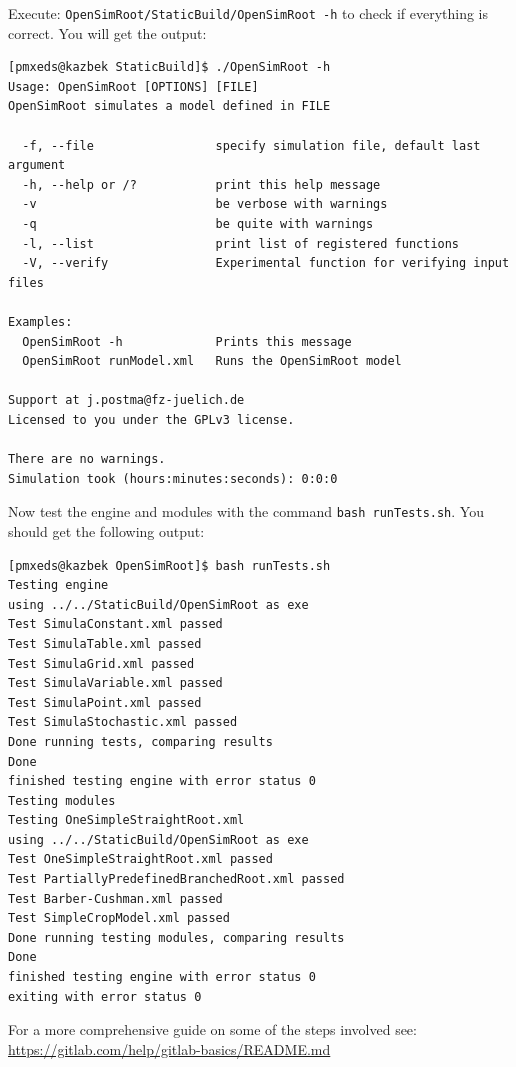 \documentclass{article}
\begin{document}
\noindent Execute: \verb|OpenSimRoot/StaticBuild/OpenSimRoot -h| to check if everything is correct. You will get the output:

\begin{verbatim}
[pmxeds@kazbek StaticBuild]$ ./OpenSimRoot -h
Usage: OpenSimRoot [OPTIONS] [FILE]
OpenSimRoot simulates a model defined in FILE

  -f, --file                 specify simulation file, default last argument
  -h, --help or /?           print this help message
  -v                         be verbose with warnings
  -q                         be quite with warnings
  -l, --list                 print list of registered functions
  -V, --verify               Experimental function for verifying input files

Examples:
  OpenSimRoot -h             Prints this message
  OpenSimRoot runModel.xml   Runs the OpenSimRoot model 

Support at j.postma@fz-juelich.de
Licensed to you under the GPLv3 license.

There are no warnings.
Simulation took (hours:minutes:seconds): 0:0:0
\end{verbatim}

\noindent Now test the engine and modules with the command \verb|bash runTests.sh|. You should get the following output:

\begin{verbatim}
[pmxeds@kazbek OpenSimRoot]$ bash runTests.sh 
Testing engine
using ../../StaticBuild/OpenSimRoot as exe
Test SimulaConstant.xml passed
Test SimulaTable.xml passed
Test SimulaGrid.xml passed
Test SimulaVariable.xml passed
Test SimulaPoint.xml passed
Test SimulaStochastic.xml passed
Done running tests, comparing results
Done
finished testing engine with error status 0
Testing modules
Testing OneSimpleStraightRoot.xml
using ../../StaticBuild/OpenSimRoot as exe
Test OneSimpleStraightRoot.xml passed
Test PartiallyPredefinedBranchedRoot.xml passed
Test Barber-Cushman.xml passed
Test SimpleCropModel.xml passed
Done running testing modules, comparing results
Done
finished testing engine with error status 0
exiting with error status 0
\end{verbatim}

\noindent For a more comprehensive guide on some of the steps involved see: \\
\url{https://gitlab.com/help/gitlab-basics/README.md} \newline
\end{document}
